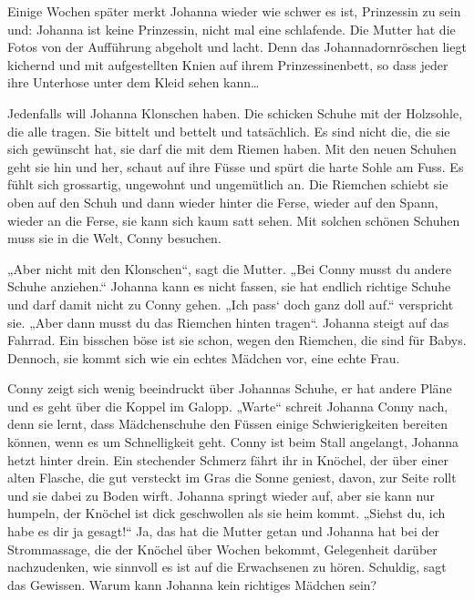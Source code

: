 Einige Wochen später merkt Johanna wieder wie schwer es ist, Prinzessin zu sein und: Johanna ist keine Prinzessin, nicht mal eine schlafende. Die Mutter hat die Fotos von der Aufführung abgeholt und lacht. Denn das Johannadornröschen liegt kichernd und mit aufgestellten Knien auf ihrem Prinzessinenbett, so dass jeder ihre Unterhose unter dem Kleid sehen kann\dots


\sterne


Jedenfalls will Johanna Klonschen haben. Die schicken Schuhe mit der Holzsohle, die alle tragen. Sie bittelt und bettelt und tatsächlich. Es sind nicht die, die sie sich gewünscht hat, sie darf die mit dem Riemen haben. Mit den neuen Schuhen geht sie hin und her, schaut auf ihre Füsse und spürt die harte Sohle am Fuss. Es fühlt sich grossartig, ungewohnt und ungemütlich an. Die Riemchen schiebt sie oben auf den Schuh und dann wieder hinter die Ferse, wieder auf den Spann, wieder an die Ferse, sie kann sich kaum satt sehen. Mit solchen schönen Schuhen muss sie in die Welt, Conny besuchen.

 „Aber nicht mit den Klonschen“, sagt die Mutter. „Bei Conny musst du andere Schuhe anziehen.“ Johanna kann es nicht fassen, sie hat endlich richtige Schuhe und darf damit nicht zu Conny gehen. „Ich pass` doch ganz doll auf.“ verspricht sie. „Aber dann musst du das Riemchen hinten tragen“. Johanna steigt auf das Fahrrad. Ein bisschen böse ist sie schon, wegen den Riemchen, die sind für Babys.  Dennoch,  sie kommt sich wie ein echtes Mädchen vor, eine echte Frau. 
 
Conny zeigt sich wenig beeindruckt über Johannas Schuhe, er hat andere Pläne und es geht über die Koppel im Galopp. „Warte“ schreit Johanna Conny nach, denn sie lernt, dass  Mädchenschuhe den Füssen einige Schwierigkeiten bereiten können, wenn es um Schnelligkeit geht. Conny ist beim Stall angelangt, Johanna hetzt hinter drein. Ein stechender Schmerz fährt ihr in Knöchel, der über einer alten Flasche, die gut versteckt im Gras die Sonne geniest, davon, zur Seite rollt und sie dabei zu Boden wirft. Johanna springt wieder auf, aber sie kann nur humpeln, der Knöchel ist dick geschwollen als sie heim kommt. „Siehst du, ich habe es dir ja gesagt!“ Ja, das hat die Mutter getan und Johanna hat bei der Strommassage, die der Knöchel über Wochen bekommt, Gelegenheit darüber nachzudenken, wie sinnvoll es ist auf die Erwachsenen zu hören. Schuldig, sagt das Gewissen. Warum kann Johanna kein richtiges Mädchen sein?


\sterne



